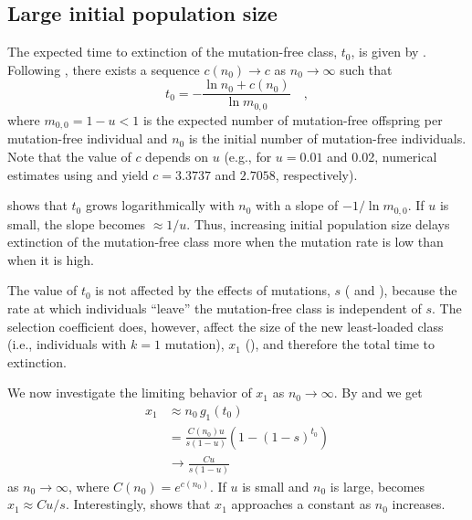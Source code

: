 \documentclass[9pt,lineno]{elife}
\begin{document}
\subsection{Large initial population size}


The expected time to extinction of the mutation-free class, $t_0$, is given by .
Following \citet{Jagers_On_2007}, there exists a sequence $c(n_0)\to c$ as $n_0\to\infty$ such that
%
\begin{equation}
t_0 = -\frac{\ln n_0 + c(n_0)}{\ln m_{0,0}} \quad ,
\label{eq:jagers}
\end{equation}
%
where $m_{0,0} = 1-u <1$ is the expected number of mutation-free offspring per mutation-free individual and $n_0$ is the initial number of mutation-free individuals.  Note that the value of $c$ depends on $u$ (e.g., for $u=0.01$ and 0.02, numerical estimates using  and  yield $c=3.3737$ and $2.7058$, respectively).

 shows that $t_0$ grows logarithmically with $n_0$ 
with a slope of $-1/\ln m_{0,0}$.  If $u$ is small, the slope becomes $\approx 1/u$.  Thus, increasing initial population size delays extinction of the mutation-free class more when the mutation rate is low than when it is high.

The value of $t_0$ is not affected by the effects of mutations, $s$ ( and ), because the rate at which individuals ``leave'' the mutation-free class is independent of $s$.  The selection coefficient does, however, affect the size of the new least-loaded class (i.e., individuals with $k=1$ mutation), $x_1$ (), and therefore the total time to extinction. 

We now investigate the limiting behavior of $x_1$ as $n_0\to\infty$. By  and  we get 
%
\begin{align}
%
x_{1} &\approx n_0 \, g_{1}(t_0) \nonumber \\[3pt]
      &= \frac{C(n_0) u}{s(1-u)} \left(1-(1-s)^{t_0}\right) \nonumber \\[3pt]
      &\to \frac{C u}{s(1-u)}
%
\label{eq:x1}
\end{align}
%
as $n_0\to\infty$, where $C(n_0) = e^{c(n_0)}$. If $u$ is small and $n_0$ is large, 
 becomes $x_1 \approx C u / s$.
Interestingly,  shows that $x_1$ approaches a constant as $n_0$ increases.
\end{document}
